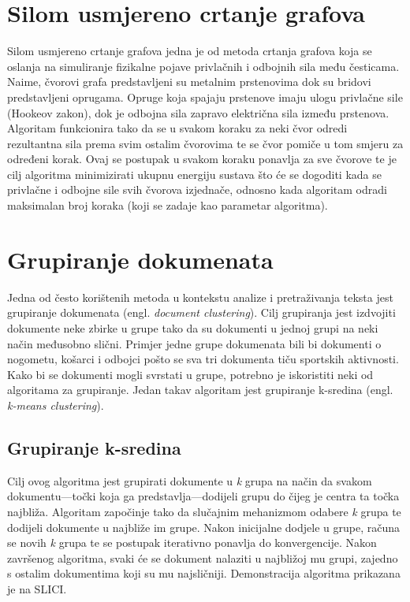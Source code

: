 \documentclass[times, utf8, zavrsni]{fer}
\begin{document}
\section{Silom usmjereno crtanje grafova}
\label{subchap:forcedir}
Silom usmjereno crtanje grafova jedna je od metoda crtanja grafova koja se oslanja na simuliranje fizikalne pojave privlačnih i odbojnih sila među česticama. Naime, čvorovi grafa predstavljeni su metalnim prstenovima dok su bridovi predstavljeni oprugama. Opruge koja spajaju prstenove imaju ulogu privlačne sile (Hookeov zakon), dok je odbojna sila zapravo električna sila između prstenova. Algoritam funkcionira tako da se u svakom koraku za neki čvor odredi rezultantna sila prema svim ostalim čvorovima te se čvor pomiče u tom smjeru za određeni korak. Ovaj se postupak u svakom koraku ponavlja za sve čvorove te je cilj algoritma minimizirati ukupnu energiju sustava što će se dogoditi kada se privlačne i odbojne sile svih čvorova izjednače, odnosno kada algoritam odradi maksimalan broj koraka (koji se zadaje kao parametar algoritma).

\section{Grupiranje dokumenata}
Jedna od često korištenih metoda u kontekstu analize i pretraživanja teksta jest grupiranje dokumenata (engl. \textit{document clustering}). Cilj grupiranja jest izdvojiti dokumente neke zbirke u grupe tako da su dokumenti u jednoj grupi na neki način međusobno slični. Primjer jedne grupe dokumenata bili bi dokumenti o nogometu, košarci i odbojci pošto se sva tri dokumenta tiču sportskih aktivnosti. Kako bi se dokumenti mogli svrstati u grupe, potrebno je iskoristiti neki od algoritama za grupiranje. Jedan takav algoritam jest grupiranje k-sredina (engl. \textit{k-means clustering}).

\subsection{Grupiranje k-sredina}
Cilj ovog algoritma jest grupirati dokumente u \textit{k} grupa na način da svakom dokumentu—točki koja ga predstavlja—dodijeli grupu do čijeg je centra ta točka najbliža. Algoritam započinje tako da slučajnim mehanizmom odabere \textit{k} grupa te dodijeli dokumente u najbliže im grupe. Nakon inicijalne dodjele u grupe, računa se novih \textit{k} grupa te se postupak iterativno ponavlja do konvergencije. Nakon završenog algoritma, svaki će se dokument nalaziti u najbližoj mu grupi, zajedno s ostalim dokumentima koji su mu najsličniji. Demonstracija algoritma prikazana je na SLICI.
\end{document}
